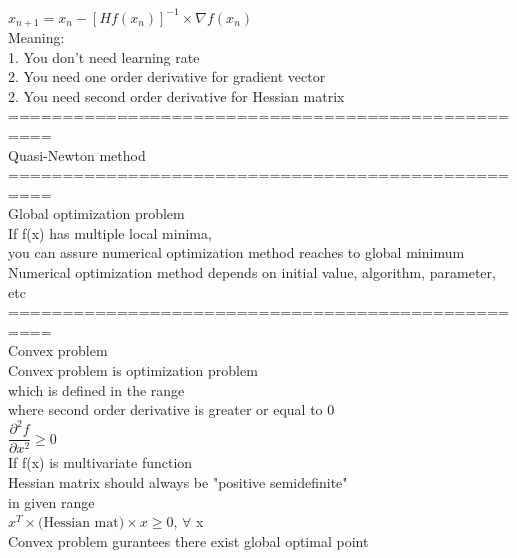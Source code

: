 \documentclass{article}
\begin{document}
${x}_{n+1} = {x}_n - [{H}f({x}_n)]^{-1} \times \nabla f({x}_n)$ \\ 

Meaning: \\ 
1. You don't need learning rate \\ 
2. You need one order derivative for gradient vector \\ 
2. You need second order derivative for Hessian matrix \\ 

==================================================\\
Quasi-Newton method \\ 

==================================================\\
Global optimization problem \\ 
If f(x) has multiple local minima, \\ 
you can assure numerical optimization method reaches to global minimum \\

Numerical optimization method depends on initial value, algorithm, parameter, etc \\ 

==================================================\\
Convex problem \\ 
Convex problem is optimization problem \\
which is defined in the range\\
where second order derivative is greater or equal to 0 \\ 

$\dfrac{\partial^2 f}{\partial x^2} \ge 0$ \\

If f(x) is multivariate function \\ 
Hessian matrix should always be "positive semidefinite" \\ 
in given range \\ 

$x^T \times \text{(Hessian mat)} \times x \ge 0$, $\forall$ x \\ 

Convex problem gurantees there exist global optimal point \\ 
\end{document}
